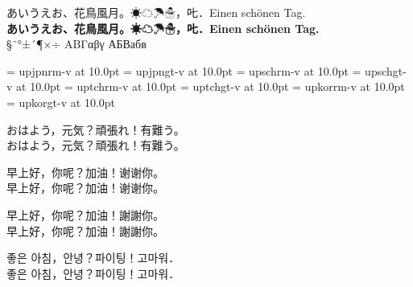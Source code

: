 \documentclass[landscape]{utarticle}
\begin{document}
\parindent0mm
\pagestyle{empty}
あいうえお、花鳥風月。☀☁☂☃，𠮟．Einen schönen Tag.\\
{\bfseries あいうえお、花鳥風月。☀☁☂☃，𠮟．Einen schönen Tag.}\\
§¨°±´¶×÷ ΑΒΓαβγ АБВабв

\font\upjpnrmm = upjpnrm-v at 10.0pt
\font\upjpngtm = upjpngt-v at 10.0pt
\font\upschrmm = upschrm-v at 10.0pt
\font\upschgtm = upschgt-v at 10.0pt
\font\uptchrmm = uptchrm-v at 10.0pt
\font\uptchgtm = uptchgt-v at 10.0pt
\font\upkorrmm = upkorrm-v at 10.0pt
\font\upkorgtm = upkorgt-v at 10.0pt

\upjpnrmm おはよう，元気？頑張れ！有難う。\\
\upjpngtm おはよう，元気？頑張れ！有難う。

\upschrmm 早上好，你呢？加油！谢谢你。\\
\upschgtm 早上好，你呢？加油！谢谢你。

\uptchrmm 早上好，你呢？加油！謝謝你。\\
\uptchgtm 早上好，你呢？加油！謝謝你。

\upkorrmm 좋은 아침，안녕？파이팅！고마워．\\
\upkorgtm 좋은 아침，안녕？파이팅！고마워．
\end{document}

